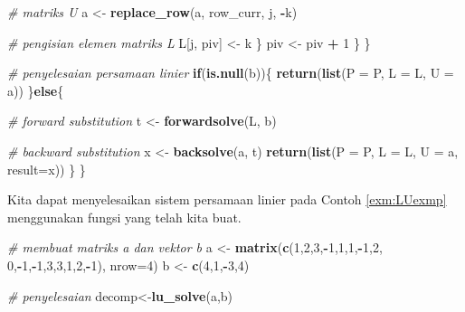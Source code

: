 \documentclass[]{book}
\newenvironment{Shaded}{\begin{snugshade}}{\end{snugshade}}
\newcommand{\CommentTok}[1]{\textcolor[rgb]{0.56,0.35,0.01}{\textit{#1}}}
\newcommand{\ControlFlowTok}[1]{\textcolor[rgb]{0.13,0.29,0.53}{\textbf{#1}}}
\newcommand{\DataTypeTok}[1]{\textcolor[rgb]{0.13,0.29,0.53}{#1}}
\newcommand{\DecValTok}[1]{\textcolor[rgb]{0.00,0.00,0.81}{#1}}
\newcommand{\KeywordTok}[1]{\textcolor[rgb]{0.13,0.29,0.53}{\textbf{#1}}}
\newcommand{\NormalTok}[1]{#1}
\newcommand{\OperatorTok}[1]{\textcolor[rgb]{0.81,0.36,0.00}{\textbf{#1}}}
\newcommand{\StringTok}[1]{\textcolor[rgb]{0.31,0.60,0.02}{#1}}
\theoremstyle{definition}
\theoremstyle{definition}
\theoremstyle{definition}
\theoremstyle{remark}
\begin{document}
\begin{Shaded}
\begin{Highlighting}[]
  \CommentTok{# matriks U}
\NormalTok{                    a <-}\StringTok{ }\KeywordTok{replace_row}\NormalTok{(a, row_curr, j, }\OperatorTok{-}\NormalTok{k)}
                    
  \CommentTok{# pengisian elemen matriks L}
\NormalTok{                    L[j, piv] <-}\StringTok{ }\NormalTok{k}
\NormalTok{                \}}
\NormalTok{            piv <-}\StringTok{ }\NormalTok{piv }\OperatorTok{+}\StringTok{ }\DecValTok{1}
\NormalTok{        \}}
\NormalTok{    \}}
    
\CommentTok{# penyelesaian persamaan linier}
    \ControlFlowTok{if}\NormalTok{(}\KeywordTok{is.null}\NormalTok{(b))\{}
      \KeywordTok{return}\NormalTok{(}\KeywordTok{list}\NormalTok{(}\DataTypeTok{P =}\NormalTok{ P, }\DataTypeTok{L =}\NormalTok{ L, }\DataTypeTok{U =}\NormalTok{ a))}
\NormalTok{    \}}\ControlFlowTok{else}\NormalTok{\{}
      
      \CommentTok{# forward substitution}
\NormalTok{      t <-}\StringTok{ }\KeywordTok{forwardsolve}\NormalTok{(L, b)}
      
      \CommentTok{# backward substitution}
\NormalTok{      x <-}\StringTok{ }\KeywordTok{backsolve}\NormalTok{(a, t)}
      \KeywordTok{return}\NormalTok{(}\KeywordTok{list}\NormalTok{(}\DataTypeTok{P =}\NormalTok{ P, }\DataTypeTok{L =}\NormalTok{ L, }\DataTypeTok{U =}\NormalTok{ a, }\DataTypeTok{result=}\NormalTok{x))}
\NormalTok{     \}}
\NormalTok{\}}
\end{Highlighting}
\end{Shaded}

Kita dapat menyelesaikan sistem persamaan linier pada Contoh \ref{exm:LUexmp} menggunakan fungsi yang telah kita buat.

\begin{Shaded}
\begin{Highlighting}[]
\CommentTok{# membuat matriks a dan vektor b}
\NormalTok{a <-}\StringTok{ }\KeywordTok{matrix}\NormalTok{(}\KeywordTok{c}\NormalTok{(}\DecValTok{1}\NormalTok{,}\DecValTok{2}\NormalTok{,}\DecValTok{3}\NormalTok{,}\OperatorTok{-}\DecValTok{1}\NormalTok{,}\DecValTok{1}\NormalTok{,}\DecValTok{1}\NormalTok{,}\OperatorTok{-}\DecValTok{1}\NormalTok{,}\DecValTok{2}\NormalTok{,}
              \DecValTok{0}\NormalTok{,}\OperatorTok{-}\DecValTok{1}\NormalTok{,}\OperatorTok{-}\DecValTok{1}\NormalTok{,}\DecValTok{3}\NormalTok{,}\DecValTok{3}\NormalTok{,}\DecValTok{1}\NormalTok{,}\DecValTok{2}\NormalTok{,}\OperatorTok{-}\DecValTok{1}\NormalTok{),}
            \DataTypeTok{nrow=}\DecValTok{4}\NormalTok{)}
\NormalTok{b <-}\StringTok{ }\KeywordTok{c}\NormalTok{(}\DecValTok{4}\NormalTok{,}\DecValTok{1}\NormalTok{,}\OperatorTok{-}\DecValTok{3}\NormalTok{,}\DecValTok{4}\NormalTok{)}

\CommentTok{# penyelesaian}
\NormalTok{decomp<-}\KeywordTok{lu_solve}\NormalTok{(a,b)}
\end{Highlighting}
\end{Shaded}
\end{document}
